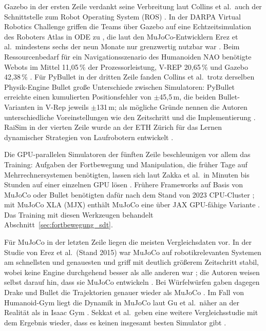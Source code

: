 Gazebo in der ersten Zeile verdankt seine Verbreitung laut Collins et al.\ auch der Schnittstelle zum Robot Operating System (ROS) \cite{Collins2021}.
In der DARPA Virtual Robotics Challenge griffen die Teams über Gazebo auf eine Echtzeitsimulation des Roboters Atlas in ODE zu \cite{Erez2015}, die laut den MuJoCo-Entwicklern Erez et al.\ mindestens sechs der neun Monate nur grenzwertig nutzbar war \cite{Erez2015}.
Beim Ressourcenbedarf für ein Navigationsszenario des Humanoiden NAO benötigte Webots im Mittel 11,05\,\% der Prozessorleistung, V-REP 20,65\,\% und Gazebo 42,38\,\% \cite{Ayala2020}.
Für PyBullet in der dritten Zeile fanden Collins et al.\ trotz derselben Physik-Engine Bullet große Unterschiede zwischen Simulatoren: PyBullet erreichte einen kumulierten Positionsfehler von $\pm$45,5\,m, die beiden Bullet-Varianten in V-Rep jeweils $\pm$131\,m; als mögliche Gründe nennen die Autoren unterschiedliche Voreinstellungen wie den Zeitschritt und die Implementierung \cite{Collins2019}.
RaiSim in der vierten Zeile wurde an der ETH Zürich für das Lernen dynamischer Strategien von Laufrobotern entwickelt \cite{Collins2021}.

Die GPU-parallelen Simulatoren der fünften Zeile beschleunigen vor allem das Training: Aufgaben der Fortbewegung und Manipulation, die früher Tage auf Mehrrechnersystemen benötigten, lassen sich laut Zakka et al.\ in Minuten bis Stunden auf einer einzelnen GPU lösen \cite{Zakka2025}.
Frühere Frameworks auf Basis von MuJoCo oder Bullet benötigten dafür nach dem Stand von 2023 CPU-Cluster \cite{Mittal2023}; mit MuJoCo XLA (MJX) enthält MuJoCo eine über JAX GPU-fähige Variante \cite{Ha2025}.
Das Training mit diesen Werkzeugen behandelt Abschnitt~\ref{sec:fortbewegung_sdt}.

Für MuJoCo in der letzten Zeile liegen die meisten Vergleichsdaten vor.
In der Studie von Erez et al.\ (Stand 2015) war MuJoCo auf robotikrelevanten Systemen am schnellsten und genauesten und griff mit deutlich größerem Zeitschritt stabil, wobei keine Engine durchgehend besser als alle anderen war \cite{Erez2015}; die Autoren weisen selbst darauf hin, dass sie MuJoCo entwickeln \cite{Erez2015}.
Bei Würfelwürfen gaben dagegen Drake und Bullet die Trajektorien genauer wieder als MuJoCo \cite{Acosta2022}.
Im Fall von Humanoid-Gym liegt die Dynamik in MuJoCo laut Gu et al.\ näher an der Realität als in Isaac Gym \cite{Gu2024}.
Sekkat et al.\ geben eine weitere Vergleichsstudie mit dem Ergebnis wieder, dass es keinen insgesamt besten Simulator gibt \cite{Sekkat2024}.

